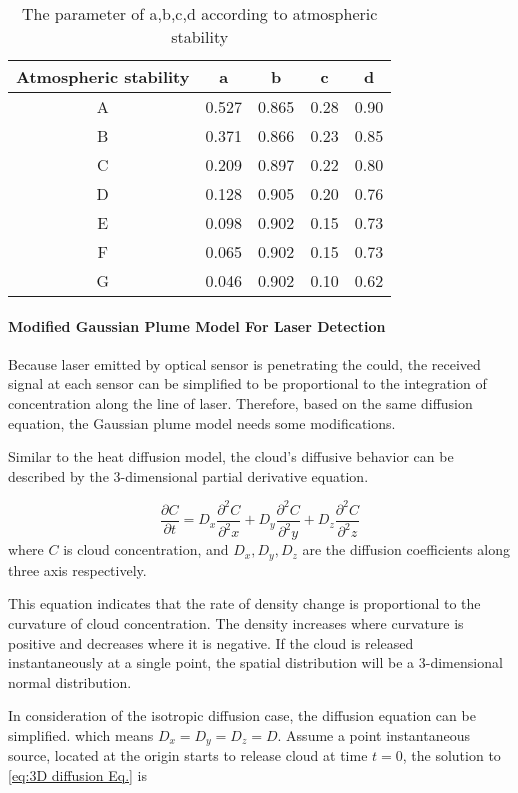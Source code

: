 \begin{table}
\caption{\label{tab:The-parameter-of}The parameter of a,b,c,d according to
atmospheric stability}
\hfill{}%
\begin{tabular}{|c|c|c|c|c|}
\hline 
Atmospheric stability  & a & b & c & d\tabularnewline
\hline 
\hline 
A & 0.527 & 0.865 & 0.28 & 0.90\tabularnewline
\hline 
B & 0.371 & 0.866 & 0.23 & 0.85\tabularnewline
\hline 
C & 0.209 & 0.897 & 0.22 & 0.80\tabularnewline
\hline 
D & 0.128 & 0.905 & 0.20 & 0.76\tabularnewline
\hline 
E & 0.098 & 0.902 & 0.15 & 0.73\tabularnewline
\hline 
F & 0.065 & 0.902 & 0.15 & 0.73\tabularnewline
\hline 
G & 0.046 & 0.902 & 0.10 & 0.62\tabularnewline
\hline 
\end{tabular}\hfill{}
\end{table}



\paragraph{Modified Gaussian Plume Model For Laser Detection}

Because laser emitted by optical sensor is penetrating the could,
the received signal at each sensor can be simplified to be proportional
to the integration of concentration along the line of laser. Therefore,
based on the same diffusion equation, the Gaussian plume model needs
some modifications. 

Similar to the heat diffusion model, the cloud's diffusive behavior
can be described by the 3-dimensional partial derivative equation. 

\begin{equation}
\frac{\partial C}{\partial t}=D_{x}\frac{\partial^{2}C}{\partial^{2}x}+D_{y}\frac{\partial^{2}C}{\partial^{2}y}+D_{z}\frac{\partial^{2}C}{\partial^{2}z}\label{eq:3D diffusion Eq.}
\end{equation}
where $C$ is cloud concentration, and $D_{x},D_{y},D_{z}$ are the
diffusion coefficients along three axis respectively. 

This equation indicates that the rate of density change is proportional
to the curvature of cloud concentration. The density increases where
curvature is positive and decreases where it is negative. If the cloud
is released instantaneously at a single point, the spatial distribution
will be a 3-dimensional normal distribution.

In consideration of the isotropic diffusion case, the diffusion equation
can be simplified. which means $D_{x}=D_{y}=D_{z}=D$. Assume a point
instantaneous source, located at the origin starts to release cloud
at time $t=0$, the solution to \ref{eq:3D diffusion Eq.} is 

